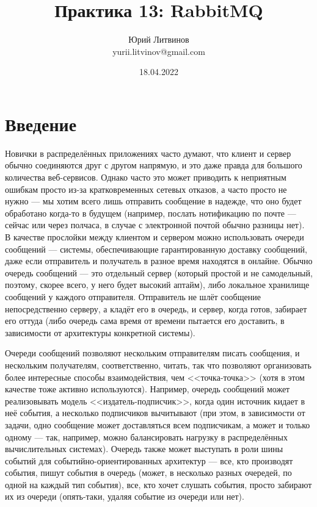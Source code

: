\documentclass[a5paper]{article}
\title{Практика 13: RabbitMQ}
\author{Юрий Литвинов\\\small{yurii.litvinov@gmail.com}}
\date{18.04.2022}
\begin{document}
\maketitle
\thispagestyle{empty}

\section{Введение}

Новички в распределённых приложениях часто думают, что клиент и сервер обычно соединяются друг с другом напрямую, и это даже правда для большого количества веб-сервисов. Однако часто это может приводить к неприятным ошибкам просто из-за кратковременных сетевых отказов, а часто просто не нужно --- мы хотим всего лишь отправить сообщение в надежде, что оно будет обработано когда-то в будущем (например, послать нотификацию по почте --- сейчас или через полчаса, в случае с электронной почтой обычно разницы нет). В качестве прослойки между клиентом и сервером можно использовать очереди сообщений --- системы, обеспечивающие гарантированную доставку сообщений, даже если отправитель и получатель в разное время находятся в онлайне. Обычно очередь сообщений --- это отдельный сервер (который простой и не самодельный, поэтому, скорее всего, у него будет высокий аптайм), либо локальное хранилище сообщений у каждого отправителя. Отправитель не шлёт сообщение непосредственно серверу, а кладёт его в очередь, и сервер, когда готов, забирает его оттуда (либо очередь сама время от времени пытается его доставить, в зависимости от архитектуры конкретной системы).

Очереди сообщений позволяют нескольким отправителям писать сообщения, и нескольким получателям, соответственно, читать, так что позволяют организовать более интересные способы взаимодействия, чем <<точка-точка>> (хотя в этом качестве тоже активно используются). Например, очередь сообщений может реализовывать модель <<издатель-подписчик>>, когда один источник кидает в неё события, а несколько подписчиков вычитывают (при этом, в зависимости от задачи, одно сообщение может доставляться всем подписчикам, а может и только одному --- так, например, можно балансировать нагрузку в распределённых вычислительных системах). Очередь также может выступать в роли шины событий для событийно-ориентированных архитектур --- все, кто производят события, пишут события в очередь (может, в несколько разных очередей, по одной на каждый тип события), все, кто хочет слушать события, просто забирают их из очереди (опять-таки, удаляя событие из очереди или нет).
\end{document}
